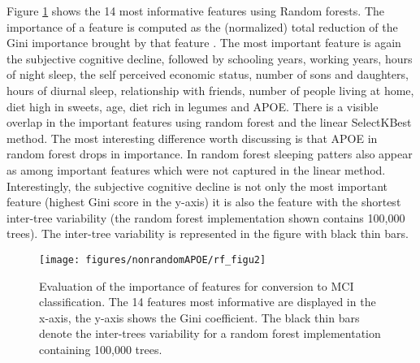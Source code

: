 \documentclass[preprint,12pt]{elsarticle}
\begin{document}

Figure \ref{fig:RF_selectorgini} shows the 14 most informative features using Random forests. The importance of a feature is computed as the (normalized) total reduction of the Gini importance brought by that feature \cite{breiman2017classification}. The most important feature is again the subjective cognitive decline, followed by schooling years, working years, hours of night sleep, the self perceived economic status, number of sons and daughters, hours of diurnal sleep, relationship with friends, number of people living at home, diet high in sweets, age, diet rich in legumes and APOE.
There is a visible overlap in the important features using random forest and the linear SelectKBest method. The most interesting difference worth discussing is that APOE in random forest drops in importance. In random forest sleeping patters also appear as among important features which were not captured in the linear method. 
Interestingly, the subjective cognitive decline is not only the most important feature (highest Gini score in the y-axis) it is also the feature with the shortest inter-tree variability (the random forest implementation shown contains 100,000 trees). The inter-tree variability is represented in the figure with black thin bars. 

\begin{figure}[!htb]
        \centering
        \texttt{[image: figures/nonrandomAPOE/rf\_figu2]}
        \caption{Evaluation of the importance of features for conversion to MCI classification.  The 14 features most informative are displayed in the x-axis, the y-axis shows the Gini coefficient. The black thin bars denote the inter-trees variability for a random forest implementation containing  100,000 trees.} 
        \label{fig:RF_selectorgini}
\end{figure}
\end{document}

